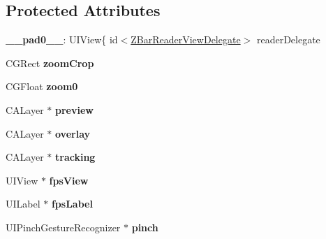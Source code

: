 \subsection*{Protected Attributes}
\begin{DoxyCompactItemize}
\item 
\hypertarget{interface_z_bar_reader_view_ad4f760a4de7e09c17e7ce177078ce87d}{
{\bfseries \_\-\_\-pad0\_\-\_\-}: UIView\{ id$<$\hyperlink{protocol_z_bar_reader_view_delegate-p}{ZBarReaderViewDelegate}$>$ readerDelegate}
\label{interface_z_bar_reader_view_ad4f760a4de7e09c17e7ce177078ce87d}

\item 
\hypertarget{interface_z_bar_reader_view_a59783f4e46e305e6115a27ed03a69ac1}{
CGRect {\bfseries zoomCrop}}
\label{interface_z_bar_reader_view_a59783f4e46e305e6115a27ed03a69ac1}

\item 
\hypertarget{interface_z_bar_reader_view_aad11e156779cb878fad3b46366d05ec3}{
CGFloat {\bfseries zoom0}}
\label{interface_z_bar_reader_view_aad11e156779cb878fad3b46366d05ec3}

\item 
\hypertarget{interface_z_bar_reader_view_a9ef559de6633d86a4b155d99a6261078}{
CALayer $\ast$ {\bfseries preview}}
\label{interface_z_bar_reader_view_a9ef559de6633d86a4b155d99a6261078}

\item 
\hypertarget{interface_z_bar_reader_view_a2fb2c8237f87900b1e90ed664e8ce080}{
CALayer $\ast$ {\bfseries overlay}}
\label{interface_z_bar_reader_view_a2fb2c8237f87900b1e90ed664e8ce080}

\item 
\hypertarget{interface_z_bar_reader_view_a586dd5a871dc5f77c96401ea820b4d46}{
CALayer $\ast$ {\bfseries tracking}}
\label{interface_z_bar_reader_view_a586dd5a871dc5f77c96401ea820b4d46}

\item 
\hypertarget{interface_z_bar_reader_view_aec75b92e864263d6952fbb617b555963}{
UIView $\ast$ {\bfseries fpsView}}
\label{interface_z_bar_reader_view_aec75b92e864263d6952fbb617b555963}

\item 
\hypertarget{interface_z_bar_reader_view_aaa1d9808d9a207617c116cc25f805139}{
UILabel $\ast$ {\bfseries fpsLabel}}
\label{interface_z_bar_reader_view_aaa1d9808d9a207617c116cc25f805139}

\item 
\hypertarget{interface_z_bar_reader_view_af7a8359ca62bfd4d67c3d2b404852c50}{
UIPinchGestureRecognizer $\ast$ {\bfseries pinch}}
\label{interface_z_bar_reader_view_af7a8359ca62bfd4d67c3d2b404852c50}


\end{DoxyCompactItemize}
